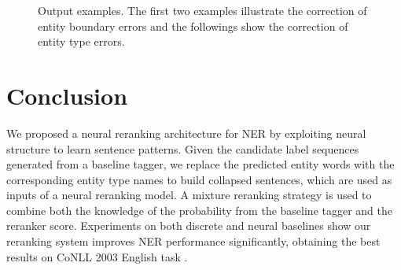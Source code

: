 \documentclass[11pt,a4paper]{article}
\begin{document}
\begin{figure}[!t] 
  \caption{Output examples. The first two examples illustrate the correction of entity boundary errors and the followings show the correction of entity type errors.}
  \label{fig:resultexample}
\end{figure}

\section{Conclusion}
We proposed a neural reranking architecture for NER by exploiting neural structure to learn sentence patterns. Given the candidate label sequences generated from a baseline tagger, we replace the predicted entity words with the corresponding entity type names to build collapsed sentences, which are used as inputs of a neural reranking model. A mixture reranking strategy is used to combine both the knowledge of the probability from the baseline tagger and the reranker score. Experiments on both discrete and neural baselines show our reranking system improves NER performance significantly, obtaining the best results on CoNLL 2003 English task .
\end{document}
